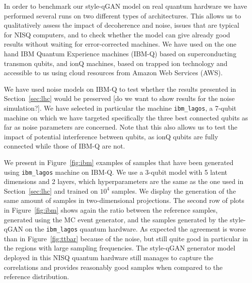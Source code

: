 \documentclass[twocolumn,preprintnumbers,superscriptaddress]{revtex4-2}
\begin{document}
In order to benchmark our style-qGAN model on real quantum hardware we
have performed several runs on two different types of
architectures. This allows us to qualitatively assess the impact of
decoherence and noise, issues that are typical for NISQ computers, and
to check whether the model can give already good results without
waiting for error-corrected machines. We have used on the one hand IBM
Quantum Experience machines (IBM-Q) based on superconducting transmon
qubits, and ionQ machines, based on trapped ion technology and
accessible to us using cloud resources from Amazon Web Services
(AWS).

We have used noise models on IBM-Q to test whether the results
presented in Section~\ref{sec:lhc} would be preserved [do we want to
show results for the noise simulation?]. We have
selected in particular the machine {\tt ibm\_lagos}, a 7-qubit machine
on which we have targeted specifically the three best connected qubits
as far as noise parameters are concerned. Note that this also allows
us to test the impact of potential interference between qubits, as
ionQ qubits are fully connected while those of IBM-Q are not.

We present in Figure~\ref{fig:ibm} examples of samples that have been
generated using {\tt ibm\_lagos} machine on IBM-Q. We use a 3-qubit
model with 5 latent dimensions and 2 layers, which hyperparameters are
the same as the one used in Section~\ref{sec:lhc} and trained on
$10^4_{}$ samples. We display the generation of the same amount of
samples in two-dimensional projections. The second row of plots in
Figure~\ref{fig:ibm} shows again the ratio between the reference
samples, generated using the MC event generator, and the samples
generated by the style-qGAN on the {\tt ibm\_lagos} quantum
hardware. As expected the agreement is worse than in
Figure~\ref{fig:ttbar} because of the noise, but still quite
good in particular in the regions with large sampling frequencies. The
style-qGAN generator model deployed in this NISQ quantum hardware still
manages to capture the correlations and provides reasonably good
samples when compared to the reference distribution.
\end{document}
